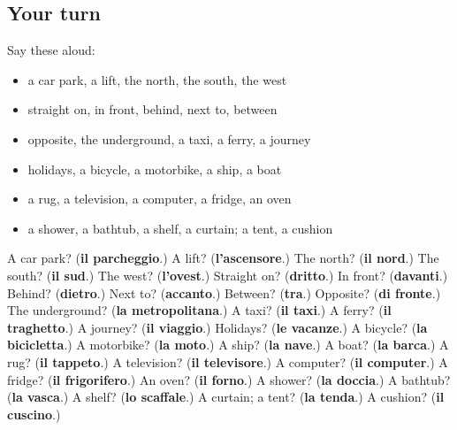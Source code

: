 \subsection*{Your turn}
Say these aloud:

\begin{itemize}
\raggedright
  \item a car park, a lift, the north, the south, the west
  \item straight on, in front, behind, next to, between
  \item opposite, the underground, a taxi, a ferry, a journey
  \item holidays, a bicycle, a motorbike, a ship, a boat
  \item a rug, a television, a computer, a fridge, an oven
  \item a shower, a bathtub, a shelf, a curtain; a tent, a cushion
\end{itemize}

\begin{tcolorbox}[breakable,colback=teal!4,colframe=teal!35!black,title={Before you move on}]
A car park? (\textbf{il parcheggio}.) A lift? (\textbf{l'ascensore}.) The north? (\textbf{il nord}.) The south? (\textbf{il sud}.) The west? (\textbf{l'ovest}.) Straight on? (\textbf{dritto}.) In front? (\textbf{davanti}.) Behind? (\textbf{dietro}.) Next to? (\textbf{accanto}.) Between? (\textbf{tra}.) Opposite? (\textbf{di fronte}.) The underground? (\textbf{la metropolitana}.) A taxi? (\textbf{il taxi}.) A ferry? (\textbf{il traghetto}.) A journey? (\textbf{il viaggio}.) Holidays? (\textbf{le vacanze}.) A bicycle? (\textbf{la bicicletta}.) A motorbike? (\textbf{la moto}.) A ship? (\textbf{la nave}.) A boat? (\textbf{la barca}.) A rug? (\textbf{il tappeto}.) A television? (\textbf{il televisore}.) A computer? (\textbf{il computer}.) A fridge? (\textbf{il frigorifero}.) An oven? (\textbf{il forno}.) A shower? (\textbf{la doccia}.) A bathtub? (\textbf{la vasca}.) A shelf? (\textbf{lo scaffale}.) A curtain; a tent? (\textbf{la tenda}.) A cushion? (\textbf{il cuscino}.)
\end{tcolorbox}
